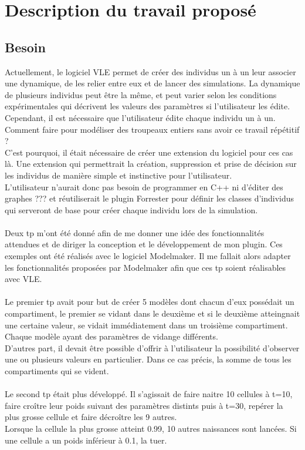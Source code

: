 \chapter{Description du travail proposé}
\setlength{\parskip}{2.5ex plus .4ex minus .4ex}

\section{Besoin}
Actuellement, le logiciel VLE permet de créer des individus un à un leur associer une dynamique, de les relier entre eux et de lancer des simulations. La dynamique de plusieurs individus peut être la même, et peut varier selon les conditions expérimentales qui décrivent les valeurs des paramètres si l'utilisateur les édite.\\
Cependant, il est nécessaire que l'utilisateur édite chaque individu un à un. Comment faire pour modéliser des troupeaux entiers sans avoir ce travail répétitif ?\\
C'est pourquoi, il était nécessaire de créer une extension du logiciel pour ces cas là. Une extension qui permettrait la création, suppression et prise de décision sur les individus de manière simple et instinctive pour l'utilisateur.\\
L'utilisateur n'aurait donc pas besoin de programmer en C++ ni d'éditer des graphes ??? et réutiliserait le plugin Forrester pour définir les classes d'individus qui serveront de base pour créer chaque individu lors de la simulation.\\
\\
Deux tp m'ont été donné afin de me donner une idée des fonctionnalités attendues et de diriger la conception et le développement de mon plugin. Ces exemples ont été réalisés avec le logiciel Modelmaker. Il me fallait alors adapter les fonctionnalités proposées par Modelmaker afin que ces tp soient réalisables avec VLE.\\
\\
Le premier tp avait pour but de créer 5 modèles dont chacun d'eux possédait un compartiment, le premier se vidant dans le deuxième et si le deuxième atteingnait une certaine valeur, se vidait immédiatement dans un troisième compartiment. Chaque modèle ayant des paramètres de vidange différents.\\
D'autres part, il devait être possible d'offrir à l'utilisateur la possibilité d'observer une ou plusieurs valeurs en particulier. Dans ce cas précis, la somme de tous les compartiments qui se vident.\\
\\
Le second tp était plus développé. Il s'agissait de faire naitre 10 cellules à t=10, faire croître leur poids suivant des paramètres distints puis à t=30, repérer la plus grosse cellule et faire décroître les 9 autres.\\ Lorsque la cellule la plus grosse atteint 0.99, 10 autres naissances sont lancées. Si une cellule a un poids inférieur à 0.1, la tuer.

